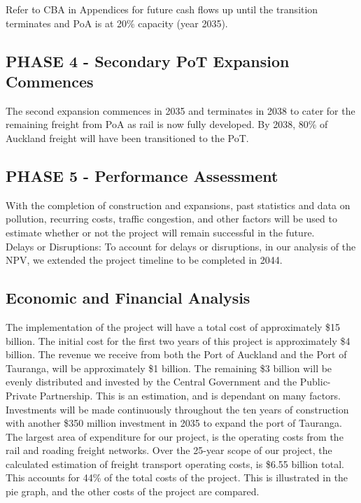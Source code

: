 Refer to CBA in Appendices for future cash flows up until the transition terminates and PoA is at 20\% capacity (year 2035).

\subsection*{PHASE 4 - Secondary PoT Expansion Commences}
The second expansion commences in 2035 and terminates in 2038 to cater for the remaining freight from PoA as rail is now fully developed. By 2038, 80\% of Auckland freight will have been transitioned to the PoT.

\subsection*{PHASE 5 - Performance Assessment}
With the completion of construction and expansions, past statistics and data on pollution, recurring costs, traffic congestion, and other factors will be used to estimate whether or not the project will remain successful in the future.
\\Delays or Disruptions:
To account for delays or disruptions, in our analysis of the NPV, we extended the project timeline to be completed in 2044.

\subsection*{Economic and Financial Analysis}
The implementation of the project will have a total cost of approximately \$15 billion. The initial cost for the first two years of this project is approximately \$4 billion. The revenue we receive from both the Port of Auckland and the Port of Tauranga, will be approximately \$1 billion. The remaining \$3 billion will be evenly distributed and invested by the Central Government and the Public-Private Partnership. This is an estimation, and is dependant on many factors. Investments will be made continuously throughout the ten years of construction with another \$350 million investment in 2035 to expand the port of Tauranga.
\\The largest area of expenditure for our project, is the operating costs from the rail and roading freight networks. Over the 25-year scope of our project, the calculated estimation of freight transport operating costs, is \$6.55 billion total. This accounts for 44\% of the total costs of the project. This is illustrated in the pie graph, and the other costs of the project are compared.

